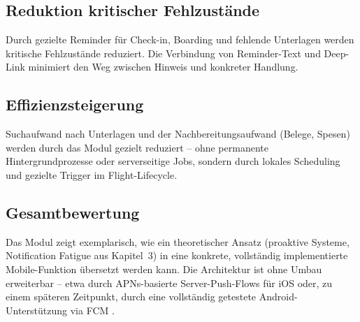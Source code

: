 \subsection{Reduktion kritischer Fehlzustände}
Durch gezielte Reminder für Check-in, Boarding und fehlende Unterlagen werden kritische
Fehlzustände reduziert.
Die Verbindung von Reminder-Text und Deep-Link minimiert den Weg zwischen Hinweis und
konkreter Handlung.

\subsection{Effizienzsteigerung}
Suchaufwand nach Unterlagen und der Nachbereitungsaufwand (Belege, Spesen) werden durch
das Modul gezielt reduziert -- ohne permanente Hintergrundprozesse oder serverseitige
Jobs, sondern durch lokales Scheduling und gezielte Trigger im Flight-Lifecycle.

\subsection{Gesamtbewertung}
Das Modul zeigt exemplarisch, wie ein theoretischer Ansatz (proaktive Systeme,
Notification Fatigue aus Kapitel~3) in eine konkrete, vollständig implementierte
Mobile-Funktion übersetzt werden kann.
Die Architektur ist ohne Umbau erweiterbar -- etwa durch APNs-basierte Server-Push-Flows
für iOS oder, zu einem späteren Zeitpunkt, durch eine vollständig getestete
Android-Unterstützung via FCM \cite{expoPushSetup,expoSendFcmApns}.
